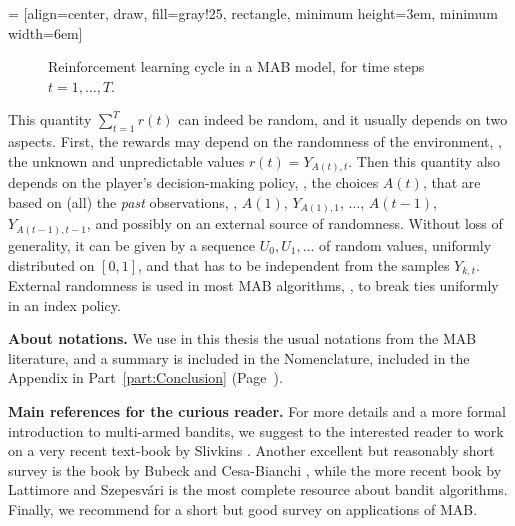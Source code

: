  = [align=center, draw, fill=gray!25, rectangle, minimum height=3em, minimum width=6em]
\begin{figure}[h!]
    \centering
\caption{Reinforcement learning cycle in a MAB model, for time steps $t=1,\dots,T$.}
\label{fig:2:ReinforcementLearningCycleMABmodel}
\end{figure}


This quantity $\sum_{t=1}^T r(t)$ can indeed be random, and it usually depends on two aspects.
First, the rewards may depend on the randomness of the environment, \ie, the unknown and unpredictable values $r(t)=Y_{A(t),t}$.
Then this quantity also depends on the player's decision-making policy, \ie, the choices $A(t)$, that are based on (all) the \emph{past} observations, \ie, $A(1)$, $Y_{A(1),1}$, $\dots$, $A(t-1)$, $Y_{A(t-1),t-1}$, and possibly on an external source of randomness.
%
Without loss of generality, it can be given by a sequence $U_0,U_1,\dots$ of \iid{} random values, uniformly distributed on $[0,1]$, and that has to be independent from the samples $Y_{k,t}$.
External randomness is used in most MAB algorithms, \eg, to break ties uniformly in an index policy.


\textbf{About notations.}
%
We use in this thesis the usual notations from the MAB literature,
and a summary is included in the Nomenclature, included in the Appendix in Part~\ref{part:Conclusion} (Page~\pageref{chapter:nomenclature}).


\textbf{Main references for the curious reader.}
%
For more details and a more formal introduction to multi-armed bandits, we suggest to the interested reader to work on a very recent text-book by Slivkins \cite{Slivkins2019}.
Another excellent but reasonably short survey is the book by Bubeck and Cesa-Bianchi \cite{Bubeck12}, while the more recent book by Lattimore and Szepesv{\'a}ri \cite{LattimoreBanditAlgorithmsBook} is the most complete resource about bandit algorithms.
Finally, we recommend \cite{bouneffouf2019survey} for a short but good survey on applications of MAB.


